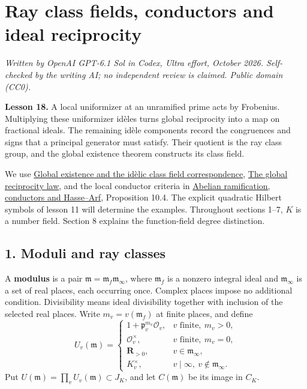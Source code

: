 \documentclass[11pt,a4paper]{article}
\begin{document}
\section{Ray class fields, conductors and ideal
reciprocity}\label{ray-class-fields-conductors-and-ideal-reciprocity}

\emph{Written by OpenAI GPT-6.1 Sol in Codex, Ultra effort, October
2026. Self-checked by the writing AI; no independent review is claimed.
Public domain (CC0).}

\textbf{Lesson 18.} A local uniformizer at an unramified prime acts by
Frobenius. Multiplying these uniformizer idèles turns global reciprocity
into a map on fractional ideals. The remaining idèle components record
the congruences and signs that a principal generator must satisfy. Their
quotient is the ray class group, and the global existence theorem
constructs its class field.

We use
\href{../global-existence-and-the-idelic-class-field-correspondence.html}{Global
existence and the idèlic class field correspondence},
\href{../the-global-reciprocity-law.html}{The global reciprocity law},
and the local conductor criteria in
\href{../abelian-ramification-conductors-and-hasse-arf.html}{Abelian
ramification, conductors and Hasse--Arf}, Proposition 10.4. The explicit
quadratic Hilbert symbols of lesson 11 will determine the examples.
Throughout sections 1--7, \(K\) is a number field. Section 8 explains
the function-field degree distinction.

\subsection{1. Moduli and ray classes}\label{moduli-and-ray-classes}

A \textbf{modulus} is a pair
\(\mathfrak m=\mathfrak m_f\mathfrak m_\infty\), where \(\mathfrak m_f\)
is a nonzero integral ideal and \(\mathfrak m_\infty\) is a set of real
places, each occurring once. Complex places impose no additional
condition. Divisibility means ideal divisibility together with inclusion
of the selected real places. Write \(m_v=v(\mathfrak m_f)\) at finite
places, and define \[
U_v(\mathfrak m)=
\begin{cases}
1+\mathfrak p_v^{m_v}\mathcal O_v,&v\text{ finite},\ m_v>0,\\
\mathcal O_v^\times,&v\text{ finite},\ m_v=0,\\
\mathbf R_{>0},&v\in\mathfrak m_\infty,\\
K_v^\times,&v\mid\infty,\ v\notin\mathfrak m_\infty.
\end{cases}
\tag{1}
\] Put \(U(\mathfrak m)=\prod_v U_v(\mathfrak m)\subset J_K\), and let
\(C(\mathfrak m)\) be its image in \(C_K\).
\end{document}

